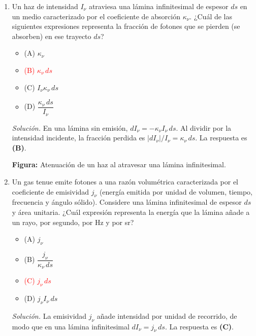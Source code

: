 \documentclass[11pt]{article}
\begin{document}
\begin{enumerate}
    \item Un haz de intensidad $I_\nu$ atraviesa una lámina infinitesimal de espesor $ds$ en un medio caracterizado por el coeficiente de absorción $\kappa_\nu$. ¿Cuál de las siguientes expresiones representa la fracción de fotones que se pierden (se absorben) en ese trayecto $ds$?
    \begin{itemize}
        \item (A) $\kappa_\nu$
        \item \textcolor{red}{(B) $\kappa_\nu\,ds$}
        \item (C) $I_\nu\kappa_\nu\,ds$
        \item (D) $\dfrac{\kappa_\nu\,ds}{I_\nu}$
    \end{itemize}
    \textit{Solución.} En una lámina sin emisión, $dI_\nu=-\kappa_\nu I_\nu\,ds$. Al dividir por la intensidad incidente, la fracción perdida es $|dI_\nu|/I_\nu=\kappa_\nu\,ds$. La respuesta es \textbf{(B)}. \parencite[Sec. 13.3, pp. 391--394]{chaparro2026}
    \begin{center}
    \par{\small\textbf{Figura:} Atenuación de un haz al atravesar una lámina infinitesimal.}
    \end{center}

    \item Un gas tenue emite fotones a una razón volumétrica caracterizada por el coeficiente de emisividad $j_\nu$ (energía emitida por unidad de volumen, tiempo, frecuencia y ángulo sólido). Considere una lámina infinitesimal de espesor $ds$ y área unitaria. ¿Cuál expresión representa la energía que la lámina añade a un rayo, por segundo, por Hz y por sr?
    \begin{itemize}
        \item (A) $j_\nu$
        \item (B) $\dfrac{j_\nu}{\kappa_\nu\,ds}$
        \item \textcolor{red}{(C) $j_\nu\,ds$}
        \item (D) $j_\nu I_\nu\,ds$
    \end{itemize}
    \textit{Solución.} La emisividad $j_\nu$ añade intensidad por unidad de recorrido, de modo que en una lámina infinitesimal $dI_\nu=j_\nu\,ds$. La respuesta es \textbf{(C)}. \parencite[Secs. 13.4 y 13.6, pp. 398--402]{chaparro2026}


\end{enumerate}
\end{document}
